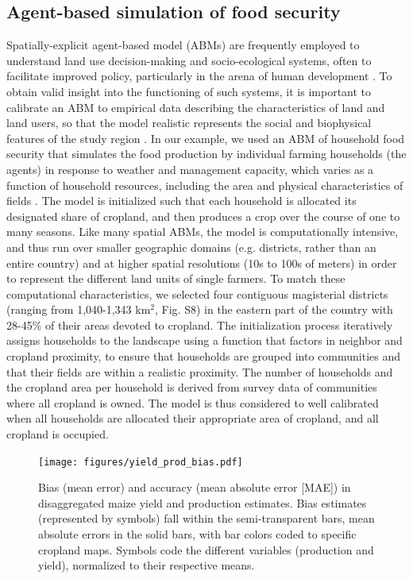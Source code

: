\documentclass{pnastwo}
\begin{document}
\begin{article}
\subsection{Agent-based simulation of food security}
Spatially-explicit agent-based model (ABMs) are frequently employed to understand land use decision-making and socio-ecological systems, often to facilitate improved policy, particularly in the arena of human development \cite{berger_creating_2006}. To obtain valid insight into the functioning of such systems, it is important to calibrate an ABM to empirical data describing the characteristics of land and land users, so that the model realistic represents the social and biophysical features of the study region \cite{berger_creating_2006}. In our example, we used an ABM of household food security that simulates the food production by individual farming households (the agents) in response to weather and management capacity, which varies as a function of household resources, including the area and physical characteristics of fields \cite{chen_dependency_2013}. The model is initialized such that each household is allocated its designated share of cropland, and then produces a crop over the course of one to many seasons. Like many spatial ABMs, the model is computationally intensive, and thus run over smaller geographic domains (e.g. districts, rather than an entire country) and at higher spatial resolutions (10s to 100s of meters) in order to represent the different land units of single farmers. To match these computational characteristics, we selected four contiguous magisterial districts (ranging from 1,040-1,343 km$^2$, Fig. S8) in the eastern part of the country with 28-45\% of their areas devoted to cropland. The initialization process iteratively assigns households to the landscape using a function that factors in neighbor and cropland proximity, to ensure that households are grouped into communities and that their fields are within a realistic proximity. The number of households and the cropland area per household is derived from survey data of communities where all cropland is owned. The model is thus considered to well calibrated when all households are allocated their appropriate area of cropland, and all cropland is occupied. 

\begin{figure}[!hb]
\centerline{\texttt{[image: figures/yield\_prod\_bias.pdf]}}
\caption{Bias (mean error) and accuracy (mean absolute error [MAE]) in disaggregated maize yield and production estimates. Bias estimates (represented by symbols) fall within the semi-transparent bars, mean absolute errors in the solid bars, with bar colors coded to specific cropland maps.  Symbols code the different variables (production and yield), normalized to their respective means.}
\label{afoto}
\end{figure}


\end{article}
\end{document}
